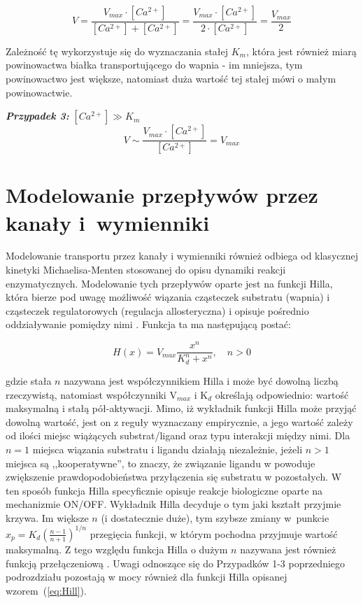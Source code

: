 \begin{equation}
V = \frac{V_{max} \cdot [Ca^{2+}]}{[Ca^{2+}] + [Ca^{2+}]} = \frac{V_{max} \cdot [Ca^{2+}]}{2\cdot [Ca^{2+}]} = \frac{V_{max}}{2}
\end{equation}

Zależność tę wykorzystuje się do wyznaczania stałej $K_m$, która jest również miarą powinowactwa białka transportującego do wapnia - im mniejsza, tym powinowactwo jest większe, natomiast duża wartość tej stałej mówi o małym powinowactwie.

\bigskip

\noindent \textbf{\textit{Przypadek 3:}} $[Ca^{2+}] \gg K_m$\\

\begin{equation}
V \sim \frac{V_{max} \cdot [Ca^{2+}]}{[Ca^{2+}]} = V_{max}
\end{equation}


\section{Modelowanie przepływów przez kanały i~wymienniki}\label{s:hill}

Modelowanie transportu przez kanały i wymienniki również odbiega od klasycznej kinetyki Michaelisa-Menten stosowanej do opisu dynamiki reakcji enzymatycznych. Modelowanie tych przepływów oparte jest na funkcji Hilla, która bierze pod uwagę możliwość wiązania cząsteczek substratu (wapnia) i cząsteczek regulatorowych (regulacja allosteryczna) i opisuje pośrednio oddziaływanie pomiędzy nimi \cite{Keener2009,Harper2006}.
Funkcja ta ma następującą postać:

\begin{equation}
H(x) =  V_{max}\frac{x^n}{K_d^n+x^n}, \quad n>0
\label{eq:Hill}
\end{equation}

\noindent gdzie stała $n$ nazywana jest współczynnikiem Hilla i może być dowolną liczbą rzeczywistą, natomiast współczynniki V$_{max}$ i K$_d$ określają odpowiednio: wartość maksymalną i stałą pół-aktywacji. Mimo, iż wykładnik funkcji Hilla może przyjąć dowolną wartość, jest on z reguły wyznaczany empirycznie, a jego wartość zależy od ilości miejsc wiążących substrat/ligand oraz typu interakcji między nimi. Dla $n=1$ miejsca wiązania substratu i ligandu działają niezależnie, jeżeli $n>1$ miejsca są ,,kooperatywne'', to znaczy, że związanie ligandu w powoduje zwiększenie prawdopodobieństwa przyłączenia się substratu w pozostałych. W ten sposób funkcja Hilla specyficznie opisuje reakcje biologiczne oparte na mechanizmie ON/OFF. Wykładnik Hilla decyduje o tym jaki kształt przyjmie krzywa. Im większe $n$ (i dostatecznie duże), tym szybsze zmiany w~punkcie
$x_p= K_d \left(\frac{n-1}{n+1}\right)^{1/n}$ przegięcia funkcji, w którym pochodna przyjmuje wartość maksymalną. Z tego względu funkcja Hilla o dużym $n$ nazywana jest również funkcją przełączeniową \cite{Gunter1990}. Uwagi odnoszące się do Przypadków 1-3 poprzedniego podrozdziału pozostają w mocy również dla funkcji Hilla opisanej wzorem~(\ref{eq:Hill}).

